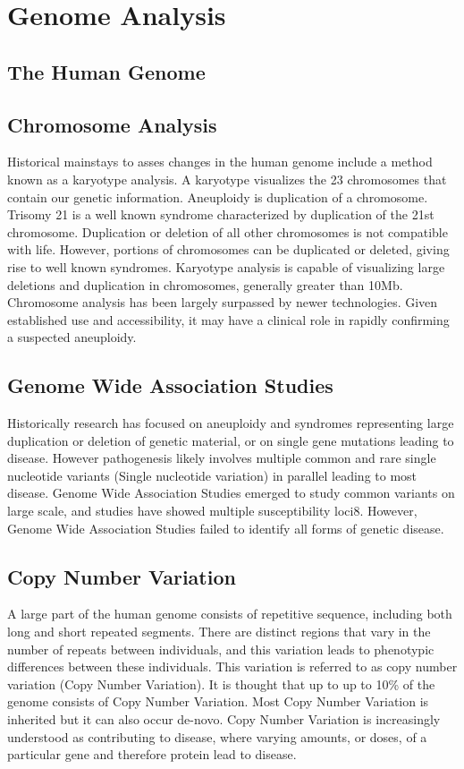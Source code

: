 \documentclass[sigconf]{acmart}
\begin{document}
\section{	Genome Analysis}

\subsection{	The Human Genome}


\subsection{Chromosome Analysis}
Historical mainstays to asses changes in the human genome include a method known as a karyotype analysis.  A karyotype visualizes the 23 chromosomes that contain our genetic information.    Aneuploidy is duplication of a chromosome.  Trisomy 21 is a well known syndrome characterized by duplication of the 21st chromosome.  Duplication or deletion of all other chromosomes is not compatible with life. However, portions of chromosomes can be duplicated or deleted, giving rise to well known syndromes.  Karyotype analysis is capable of visualizing large deletions and duplication in chromosomes, generally greater than 10Mb. Chromosome analysis has been largely surpassed by newer technologies.  Given established use and accessibility, it may have a clinical role in rapidly confirming a suspected aneuploidy.  

\subsection{Genome Wide Association Studies}
Historically research has focused on aneuploidy and syndromes representing large duplication or deletion of genetic material, or on single gene mutations leading to disease.  However pathogenesis likely involves multiple common and rare single nucleotide variants (Single nucleotide variation) in parallel leading to most disease.  Genome Wide Association Studies  emerged to study common variants on large scale, and studies have showed multiple susceptibility loci8.  However,  Genome Wide Association Studies failed to identify all forms of genetic disease. 

\subsection{Copy Number Variation}
A large part of the human genome consists of repetitive sequence, including both long and short repeated segments.  There are distinct regions that vary in the number of repeats between individuals, and this variation leads to phenotypic differences between these individuals.  This variation is referred to as copy number variation (Copy Number Variation).   It is thought that up to up to 10\% of the genome consists of Copy Number Variation.  Most Copy Number Variation is inherited but it can also occur de-novo.  Copy Number Variation is increasingly understood as contributing to disease, where varying amounts, or doses, of a particular gene and therefore protein lead to disease.   
\end{document}
